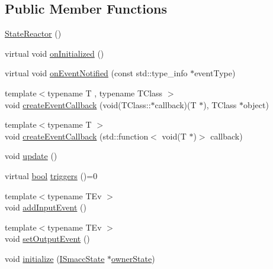 \subsection*{Public Member Functions}
\begin{DoxyCompactItemize}
\item 
\hyperlink{classsmacc_1_1StateReactor_ae319e9f7b0a2a80b4c5ace6ec8c99fb2}{State\+Reactor} ()
\item 
virtual void \hyperlink{classsmacc_1_1StateReactor_aa10b2c6b7d1e80f01b00cbdac526a2bf}{on\+Initialized} ()
\item 
virtual void \hyperlink{classsmacc_1_1StateReactor_a17646b3c68a6d80d1e4da8c14238ce36}{on\+Event\+Notified} (const std\+::type\+\_\+info $\ast$event\+Type)
\item 
{\footnotesize template$<$typename T , typename T\+Class $>$ }\\void \hyperlink{classsmacc_1_1StateReactor_a68482e08f6449694a0bcda843b14b376}{create\+Event\+Callback} (void(T\+Class\+::$\ast$callback)(T $\ast$), T\+Class $\ast$object)
\item 
{\footnotesize template$<$typename T $>$ }\\void \hyperlink{classsmacc_1_1StateReactor_ac6b3a604009e5a68123aed27e70cf2be}{create\+Event\+Callback} (std\+::function$<$ void(T $\ast$)$>$ callback)
\item 
void \hyperlink{classsmacc_1_1StateReactor_aca5d4f7af06532272db55943b7810a43}{update} ()
\item 
virtual \hyperlink{classbool}{bool} \hyperlink{classsmacc_1_1StateReactor_a445bc3c90980d75d7d815b85cfb68b21}{triggers} ()=0
\item 
{\footnotesize template$<$typename T\+Ev $>$ }\\void \hyperlink{classsmacc_1_1StateReactor_acd4b35b4c82241fc27bb858761f6e4de}{add\+Input\+Event} ()
\item 
{\footnotesize template$<$typename T\+Ev $>$ }\\void \hyperlink{classsmacc_1_1StateReactor_ae9d0dd0c8cdcc57f8881f0962040c8ed}{set\+Output\+Event} ()
\item 
void \hyperlink{classsmacc_1_1StateReactor_a5c1d734e3a495fa0f2b01229a3dbac3f}{initialize} (\hyperlink{classsmacc_1_1ISmaccState}{I\+Smacc\+State} $\ast$\hyperlink{classsmacc_1_1StateReactor_aabd30af9412a8fea9ec5906f173d9d4a}{owner\+State})
\end{DoxyCompactItemize}
